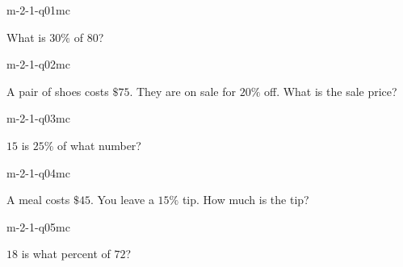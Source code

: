

\begin{practiceQuestion}{m-2-1-q01}{mc}
\begin{questionText}
What is $30\%$ of $80$?
\end{questionText}
\end{practiceQuestion}

\begin{practiceQuestion}{m-2-1-q02}{mc}
\begin{questionText}
A pair of shoes costs $\$75$. They are on sale for $20\%$ off. What is the sale price?
\end{questionText}
\end{practiceQuestion}

\begin{practiceQuestion}{m-2-1-q03}{mc}
\begin{questionText}
$15$ is $25\%$ of what number?
\end{questionText}
\end{practiceQuestion}

\begin{practiceQuestion}{m-2-1-q04}{mc}
\begin{questionText}
A meal costs $\$45$. You leave a $15\%$ tip. How much is the tip?
\end{questionText}
\end{practiceQuestion}

\begin{practiceQuestion}{m-2-1-q05}{mc}
\begin{questionText}
$18$ is what percent of $72$?
\end{questionText}
\end{practiceQuestion}


